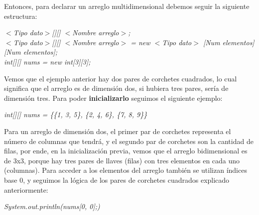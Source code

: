Entonces, para declarar un arreglo multidimensional debemos seguir la siguiente estructura:
\begin{center}
    \textit{
        $<$Tipo dato$>$[][] $<$Nombre arreglo$>$; \\
        $<$Tipo dato$>$[][] $<$Nombre arreglo$>$ = new $<$Tipo dato$>$ [Num elementos][Num elementos]; \\
        int[][] nums = new int[3][3];
    }
\end{center}

Vemos que el ejemplo anterior hay dos pares de corchetes cuadrados, lo cual significa que el arreglo es de dimensión dos, si hubiera tres pares, sería de dimensión tres. Para poder \textbf{inicializarlo} seguimos el siguiente ejemplo:
\begin{center}
    \textit{int[][] nums = \{\{1, 3, 5\}, \{2, 4, 6\}, \{7, 8, 9\}\}}
\end{center}

Para un arreglo de dimensión dos, el primer par de corchetes representa el número de columnas que tendrá, y el segundo par de corchetes son la cantidad de filas, por ende, en la inicialización previa, vemos que el arreglo bidimensional es de 3x3, porque hay tres pares de llaves (filas) con tres elementos en cada uno (columnas).
Para acceder a los elementos del arreglo también se utilizan índices base 0, y seguimos la lógica de los pares de corchetes cuadrados explicado anteriormente:
\begin{center}
    \textit{System.out.println(nums[0, 0];)}
\end{center}